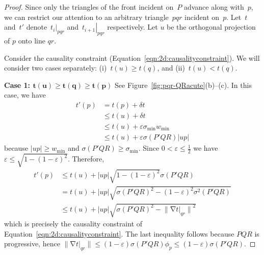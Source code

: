 \documentclass[twocolumn]{article}
\def\minW{\ensuremath{w_{\text{min}}}}
\def\S{\ensuremath{\sigma}}
\def\minS{\ensuremath{\S_{\text{min}}}}
\def\e{\ensuremath{\varepsilon}}
\def\fp{\ensuremath{P}}
\def\fq{\ensuremath{Q}}
\def\fr{\ensuremath{R}}
\DeclareMathOperator{\grad}{\ensuremath{\nabla}}
\def\abs#1{\ensuremath{\mathopen| #1 \mathclose|}}
\def\norm#1{\ensuremath{\mathopen\| #1 \mathclose\|}}
\def\dt{\ensuremath{\delta t}}
\def\rest#1#2{\ensuremath{\left. #1 \right|_{#2}}}
\def\half{\ensuremath{\frac{1}{2}}}
\begin{document}
\begin{proof}
Since only the triangles of the front incident on~$\fp$ advance
along with~$p$, we can restrict our attention to an arbitrary
triangle~$pqr$ incident on~$p$.  Let~$t$
and~$t'$ denote~$\rest{t_i}{pqr}$
and~$\rest{t_{i+1}}{pqr}$ respectively.
Let $u$ be the orthogonal projection of $p$ onto line $qr$.

Consider the causality constraint
(Equation~\ref{eqn:2d:causalityconstraint}).  We will consider two cases
separately: (i)~$t(u) \ge t(q)$, and (ii)~$t(u) < t(q)$.

\noindent\textbf{Case 1: $\mathbf{t(u) \ge t(q) \ge t(p)}$}
See Figure~\ref{fig:pqr-QRacute}(b)--(c).  In this case, we have
\begin{align*}
t'(p)
&= t(p) + \dt\\
&\le t(u) + \dt\\
&\le t(u) + \e \minS \minW\\
&\le t(u) + \e \S(\fp'\fq\fr) \abs{up}
\end{align*}
because $\abs{up} \ge \minW$ and $\S(\fp'\fq\fr) \ge \minS$.  Since $0
< \e \le \half$ we have $\e \le \sqrt{1 - (1-\e)^2}$.
Therefore,
\begin{align*}
  t'(p)
&\le 
  t(u) + \abs{up} \sqrt{1 - (1-\e)^2} \S(\fp'\fq\fr)\\
&=
  t(u) + \abs{up} \sqrt{\S(\fp'\fq\fr)^2 
                        - (1-\e)^2 \S^2(\fp'\fq\fr)}\\
&\le
  t(u) + \abs{up} \sqrt{\S(\fp'\fq\fr)^2
                          - \norm{\grad \rest{t}{qr}}^2}
\end{align*}
which is precisely the causality constraint of
Equation~\ref{eqn:2d:causalityconstraint}.  The last inequality
follows because $\fp\fq\fr$ is progressive, hence $\norm{\grad
  \rest{t}{qr}} \le (1-\e) \S(\fp'\fq\fr) \phi_p \le (1-\e)
\S(\fp'\fq\fr)$.



\end{proof}
\end{document}
